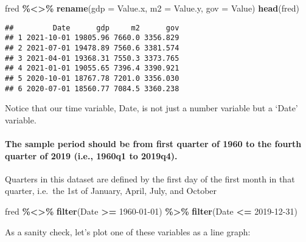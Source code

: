 \documentclass[
]{article}
\newenvironment{Shaded}{\begin{snugshade}}{\end{snugshade}}
\newcommand{\AttributeTok}[1]{\textcolor[rgb]{0.13,0.29,0.53}{#1}}
\newcommand{\FunctionTok}[1]{\textcolor[rgb]{0.13,0.29,0.53}{\textbf{#1}}}
\newcommand{\NormalTok}[1]{#1}
\newcommand{\SpecialCharTok}[1]{\textcolor[rgb]{0.81,0.36,0.00}{\textbf{#1}}}
\newcommand{\StringTok}[1]{\textcolor[rgb]{0.31,0.60,0.02}{#1}}
\begin{document}
\begin{Shaded}
\begin{Highlighting}[]
\NormalTok{fred }\SpecialCharTok{\%\textless{}\textgreater{}\%} \FunctionTok{rename}\NormalTok{(}\AttributeTok{gdp =}\NormalTok{ Value.x,}
                 \AttributeTok{m2 =}\NormalTok{ Value.y,}
                 \AttributeTok{gov =}\NormalTok{ Value)}
\FunctionTok{head}\NormalTok{(fred)}
\end{Highlighting}
\end{Shaded}

\begin{verbatim}
##         Date      gdp     m2      gov
## 1 2021-10-01 19805.96 7660.0 3356.829
## 2 2021-07-01 19478.89 7560.6 3381.574
## 3 2021-04-01 19368.31 7550.3 3373.765
## 4 2021-01-01 19055.65 7396.4 3390.921
## 5 2020-10-01 18767.78 7201.0 3356.030
## 6 2020-07-01 18560.77 7084.5 3360.238
\end{verbatim}

Notice that our time variable, Date, is not just a number variable but a
`Date' variable.

\hypertarget{the-sample-period-should-be-from-first-quarter-of-1960-to-the-fourth-quarter-of-2019-i.e.-1960q1-to-2019q4.}{%
\paragraph{The sample period should be from first quarter of 1960 to the
fourth quarter of 2019 (i.e., 1960q1 to
2019q4).}\label{the-sample-period-should-be-from-first-quarter-of-1960-to-the-fourth-quarter-of-2019-i.e.-1960q1-to-2019q4.}}

Quarters in this dataset are defined by the first day of the first month
in that quarter, i.e.~the 1st of January, April, July, and October

\begin{Shaded}
\begin{Highlighting}[]
\NormalTok{fred }\SpecialCharTok{\%\textless{}\textgreater{}\%} \FunctionTok{filter}\NormalTok{(Date }\SpecialCharTok{\textgreater{}=} \StringTok{\textquotesingle{}1960{-}01{-}01\textquotesingle{}}\NormalTok{) }\SpecialCharTok{\%\textgreater{}\%}
  \FunctionTok{filter}\NormalTok{(Date }\SpecialCharTok{\textless{}=} \StringTok{\textquotesingle{}2019{-}12{-}31\textquotesingle{}}\NormalTok{)}
\end{Highlighting}
\end{Shaded}

As a sanity check, let's plot one of these variables as a line graph:
\end{document}
